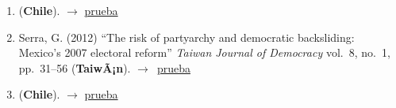 \documentclass[12 pt, letter]{article}
\newenvironment{CitasMiTrabajo}{
    \begin{footnotesize}
    \begin{enumerate}[label={\footnotesize\emph{cita~\arabic*}},ref=\arabic*] %
        \setlength{\itemsep}{.1\itemsep}
        \setlength{\parskip}{.1\parskip}
    }{\end{enumerate}\end{footnotesize}}
\begin{document}
        \begin{CitasMiTrabajo}

        \item {} (\textbf{Chile}). $\rightarrow$ \href{http://ericmagar.com/cv/cites/magarRomero2008/palma2010.pdf}{prueba}

        \item Serra, G. (2012)
            ``The risk of partyarchy and democratic backsliding: Mexico's 2007 electoral reform''
            \emph{Taiwan Journal of Democracy}
            vol.\ 8, no.\ 1, pp.\ 31--56 (\textbf{TaiwÃ¡n}). $\rightarrow$~\href{http://ericmagar.com/cv/cites/estevezEtalElecStud/serraElecRefMexico2012tjd.pdf}{prueba}

        \item {} (\textbf{Chile}). $\rightarrow$ \href{http://ericmagar.com/cv/cites/magarRomero2008/maldonado2013.pdf}{prueba}

        \label{ncites:magar.romero.2008} %

        \end{CitasMiTrabajo}

\end{document}
